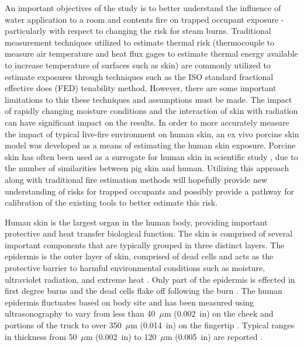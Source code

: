 \documentclass[12pt,oneside]{book}
\begin{document}
An important objectives of the study is to better understand the influence of water application to a room and contents fire on trapped occupant exposure - particularly with respect to changing the risk for steam burns. Traditional measurement techniques utilized to estimate thermal risk (thermocouple to measure air temperature and heat flux gages to estimate thermal energy available to increase temperature of surfaces such as skin) are commonly utilized to estimate exposures through techniques such as the ISO standard fractional effective does (FED) tenability method.  However, there are some important limitations to this these techniques and assumptions must be made.  The impact of rapidly changing moisture conditions and the interaction of skin with radiation can have significant impact on the results.  In order to more accurately measure the impact of typical live-fire environment on human skin, an ex vivo porcine skin model was developed as a means of estimating the human skin exposure. Porcine skin has often been used as a surrogate for human skin in scientific study \cite{Pig_Experimental_model,Of_pigs_and_men,Sensitivity_Cross-reacting}, due to the number of similarities between pig skin and human.  Utilizing this approach along with traditional fire estimation methods will hopefully provide new understanding of risks for trapped occupants and possibly provide a pathway for calibration of the existing tools to better estimate this risk.   

Human skin is the largest organ in the human body, providing important protective and heat transfer biological function.  The skin is comprised of several important components that are typically grouped in three distinct layers.  The epidermis is the outer layer of skin, comprised of dead cells and acts as the protective barrier to harmful environmental conditions such as moisture, ultraviolet radiation, and extreme heat \cite{Hummel_Barker_Lyons}. Only part of the epidermis is effected in first degree burns and the dead cells flake off following the burn \cite{Purser_Toxicity_Heat,Hummel_Barker_Lyons}. The human epidermis fluctuates based on body site and has been measured using ultrasonography to vary from less than 40~$\mu$m (0.002~in) on the cheek and portions of the truck to over 350~$\mu$m (0.014~in) on the fingertip \cite{Epidermis_Thickness}. Typical ranges in thickness from 50~$\mu$m (0.002~in) to 120~$\mu$m (0.005~in) are reported \cite{Pigs_Wound_Healing}. 
\end{document}
